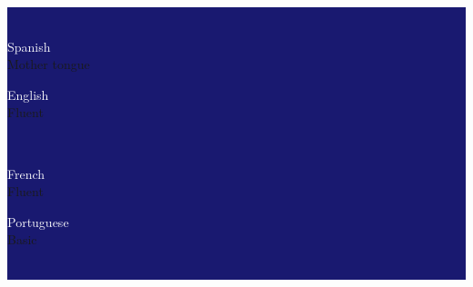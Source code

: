 \documentclass[letterpaper]{article}
\begin{document}
\begin{minipage}[t]{1\linewidth}
\colorbox{MidnightBlue}{
\begin{minipage}[t]{0.47\linewidth} %
%
	\begin{minipage}{1\linewidth} %
		\vspace{2ex}
		\\
		\vspace{2ex}
		\begin{minipage}{\linewidth}	
			\begin{minipage}{0.47\linewidth}
				\centering
				{\normalsize \textcolor{white}{Spanish}}\\
				{\small\textcolor{gray!40}{Mother tongue}}\\
			\end{minipage} 
			\begin{minipage}{0.47\linewidth}
				\centering
				{\normalsize \textcolor{white}{English}}\\					
				{\small\textcolor{gray!40}{Fluent}}\\
			\end{minipage} 
		\end{minipage}\\ 
		\vspace{2ex}
		\begin{minipage}{\linewidth}		
			\begin{minipage}{0.47\linewidth}
				\centering
				{\normalsize \textcolor{white}{French}}\\					
				{\small\textcolor{gray!40}{Fluent}}\\
			\end{minipage}
			\begin{minipage}{0.47\linewidth}
				\centering
				{\normalsize \textcolor{white}{Portuguese}}\\					
				{\small\textcolor{gray!40}{Basic}}\\
			\end{minipage}
		\end{minipage}\\
		\vspace{3ex}
	\end{minipage} %
	\begin{minipage}{1\linewidth} %

\end{minipage}
\end{minipage}}
\end{minipage}
\end{document}
